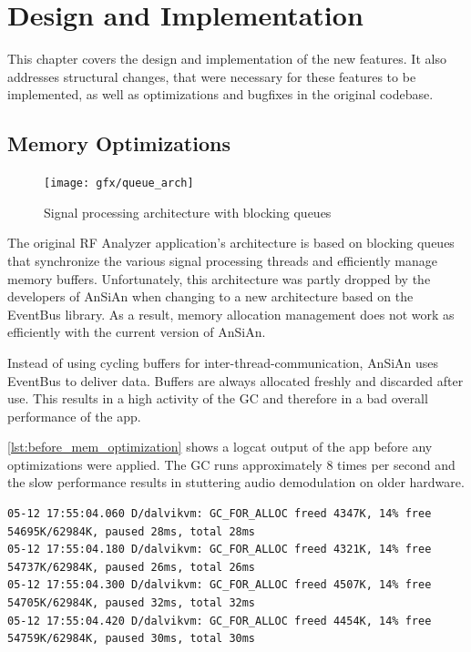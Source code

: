 \chapter{Design and Implementation}\label{ch:design_and_implementation}

This chapter covers the design and implementation of the new features. It also addresses structural changes, that were necessary for these features to be implemented, as well as optimizations and bugfixes in the original codebase.


\section{Memory Optimizations\label{sec:cleanup.mem}}

\begin{figure}
	\centering
	\texttt{[image: gfx/queue\_arch]}
	\caption{Signal processing architecture with blocking queues}
	\label{fig:queue_architecture}
\end{figure}

The original RF Analyzer application's architecture is based on
blocking queues that synchronize the various signal processing threads
and efficiently manage memory buffers. Unfortunately, this
architecture was partly dropped by the developers of \ac{AnSiAn} when
changing to a new architecture based on the EventBus library. As a result, memory
allocation management does not work as efficiently with the current version
of \ac{AnSiAn}.

Instead of using cycling buffers for inter-thread-communication, \ac{AnSiAn} uses
EventBus to deliver data. Buffers are always allocated freshly
and discarded after use. This results in a high activity of the
\ac{GC} and therefore in a bad overall performance of the app.

\autoref{lst:before_mem_optimization} shows a logcat output of the
app before any optimizations were applied. The \ac{GC} runs approximately 8 times per second
and the slow performance results in stuttering audio demodulation on
older hardware.

\begin{lstlisting}[label=lst:before_mem_optimization, caption=Logcat output
before memory optimizations, language=none]
05-12 17:55:04.060 D/dalvikvm: GC_FOR_ALLOC freed 4347K, 14% free 54695K/62984K, paused 28ms, total 28ms
05-12 17:55:04.180 D/dalvikvm: GC_FOR_ALLOC freed 4321K, 14% free 54737K/62984K, paused 26ms, total 26ms
05-12 17:55:04.300 D/dalvikvm: GC_FOR_ALLOC freed 4507K, 14% free 54705K/62984K, paused 32ms, total 32ms
05-12 17:55:04.420 D/dalvikvm: GC_FOR_ALLOC freed 4454K, 14% free 54759K/62984K, paused 30ms, total 30ms
\end{lstlisting}

